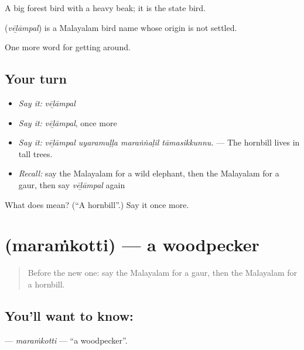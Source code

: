 A big forest bird with a heavy beak; it is the state bird.

\begin{cousinweb}
\textbf{} (\emph{vēḻāmpal}) is a Malayalam bird name whose origin is not settled.
\end{cousinweb}

\begin{grammarlens}[title={What you've built}]
One more word for getting around.
\end{grammarlens}

\subsection*{Your turn}
\begin{itemize}
\raggedright
  \item \emph{Say it:} \emph{vēḻāmpal}
  \item \emph{Say it:} \emph{vēḻāmpal}, once more
  \item \emph{Say it:} \emph{vēḻāmpal uyaramuḷḷa maraṅṅaḷil tāmasikkunnu.} — The hornbill lives in tall trees.
  \item \emph{Recall:} say the Malayalam for a wild elephant, then the Malayalam for a gaur, then say \emph{vēḻāmpal} again
\end{itemize}

\begin{tcolorbox}[breakable,colback=teal!4,colframe=teal!35!black,title={Before you move on}]
What does  mean? (\textquotedblleft{}A hornbill\textquotedblright{}.) Say it once more.
\end{tcolorbox}
\section[\texorpdfstring{\ml{മരംകൊത്തി} (maraṁkotti)}{മരംകൊത്തി (maraṁkotti)}]{ (maraṁkotti) — a woodpecker}

\label{lesson:ML-C500-maramkotti}



\begin{quote}
Before the new one: say the Malayalam for a gaur, then the Malayalam for a hornbill.
\end{quote}

\subsection*{You'll want to know: }
\textbf{} — \emph{maraṁkotti} — \textquotedblleft{}a woodpecker\textquotedblright{}.

